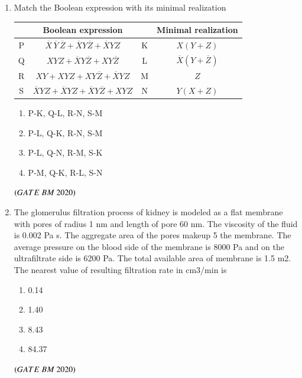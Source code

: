 \documentclass[journal,12pt,onecolumn]{IEEEtran}
\theoremstyle{remark}
\begin{document}
\begin{enumerate}
\item Match the Boolean expression with its minimal realization\\
\begin{center}
\begin{tabular}{|c|c|c|c|}
\hline
\textbf{} & \textbf{Boolean expression} & \textbf{} & \textbf{Minimal realization} \\
\hline
P & $\overline{X}\,\overline{Y}\,\overline{Z} + \overline{X}Y\overline{Z} + \overline{X}YZ$ & K & $X(Y+Z)$ \\
\hline
Q & $XYZ + \overline{X}Y\overline{Z} + XY\overline{Z}$ & L & $\overline{X}(Y+\overline{Z})$ \\
\hline
R & $XY + XYZ + XY\overline{Z} + \overline{X}YZ$ & M & $Z$ \\
\hline
S & $\overline{X}YZ + \overline{X}YZ + \overline{X}Y\overline{Z} + XYZ$ & N & $Y(X+Z)$ \\
\hline
\end{tabular}
\end{center}
\begin{enumerate}[label=\alph*)] 
\item\hspace{0.5cm}P-K, Q-L, R-N, S-M
\item\hspace{0.5cm}P-L, Q-K, R-N, S-M
\item\hspace{0.5cm}P-L, Q-N, R-M, S-K
\item\hspace{0.5cm}P-M, Q-K, R-L, S-N

\end{enumerate} 
 \hfill $\left(GATE\ BM\ 2020\right)$
 
\item The glomerulus filtration process of kidney is modeled as a flat membrane with
pores of radius 1 nm and length of pore 60 nm. The viscosity of the fluid is
0.002 Pa s. The aggregate area of the pores makeup 5%
the membrane. The average pressure on the blood side of the membrane is
8000 Pa and on the ultrafiltrate side is 6200 Pa. The total available area of
membrane is 1.5 m2. The nearest value of resulting filtration rate in cm3/min is 
\begin{enumerate}[label=\alph*)] 
\item\hspace{0.5cm}0.14
\item\hspace{0.5cm}1.40
\item\hspace{0.5cm}8.43
\item\hspace{0.5cm}84.37
\end{enumerate}
 \hfill $\left(GATE\ BM\ 2020\right)$
 

\end{enumerate}
\end{document}
